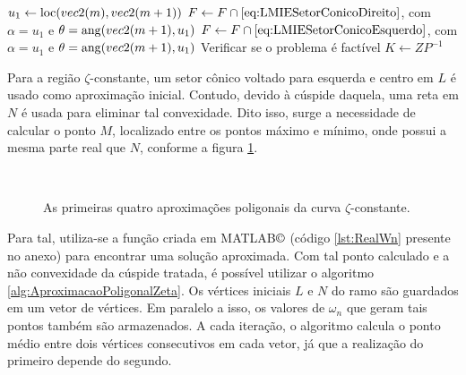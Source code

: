 \begin{algorithm}[ht!]
\begin{algorithmic}[1]
          \State $u_1 \gets \operatorname{loc}(vec2(m),vec2(m+1))$
            \State $F\gets F \cap \eqref{eq:LMIESetorConicoDireito}$, com $\alpha = u_1$ e $\theta = \operatorname{ang}(vec2(m+1),u_1)$ 
          \Else
            \State $F\gets F \cap \eqref{eq:LMIESetorConicoEsquerdo}$, com $\alpha = u_1$ e $\theta = \operatorname{ang}(vec2(m+1),u_1)$ 
          \EndIf
        \EndFor
        \State Verificar se o problema é factível 
    \EndWhile
    \State $K \gets ZP^{-1}$
  \end{algorithmic}
\end{algorithm}

Para a região $\zeta$-constante, um setor cônico voltado para esquerda e centro em $L$ é usado como aproximação inicial\cite{WISNIEWSKI2019}. Contudo, devido à cúspide daquela, uma reta em $N$ é usada para eliminar tal convexidade. Dito isso, surge a necessidade de calcular o ponto $M$, localizado entre os pontos máximo e mínimo, onde possui a mesma parte real que $N$, conforme a figura \ref{subfig:AproximacaoPoligonalZeta1}.

\begin{figure}[!ht]
  \centering
  \begin{subfigure}[t]{0.4\columnwidth}
      
      \caption{}
      \label{subfig:AproximacaoPoligonalZeta1}
  \end{subfigure}
  \begin{subfigure}[t]{0.4\columnwidth}
      
      \caption{}
      \label{subfig:AproximacaoPoligonalZeta2}
  \end{subfigure}
  \\
  \begin{subfigure}[t]{0.4\columnwidth}
    
    \caption{}
    \label{subfig:AproximacaoPoligonalZeta3}
  \end{subfigure}
  \begin{subfigure}[t]{0.4\columnwidth}
    
    \caption{}
    \label{subfig:AproximacaoPoligonalZeta4}
  \end{subfigure}
  \caption{As primeiras quatro aproximações poligonais da curva $\zeta$-constante.}
  \label{fig:AproximacoesPoligonalZeta}
\end{figure}

Para tal, utiliza-se a função criada em MATLAB$\copyright$\cite{MATLAB} (código \ref{lst:RealWn} presente no anexo) para encontrar uma solução aproximada. Com tal ponto calculado e a não convexidade da cúspide tratada, é possível utilizar o algoritmo \ref{alg:AproximacaoPoligonalZeta}. Os vértices iniciais $L$ e $N$ do ramo são guardados em um vetor de vértices. Em paralelo a isso, os valores de $\omega_n$ que geram tais pontos também são armazenados. A cada iteração, o algoritmo calcula o ponto médio entre dois vértices consecutivos em cada vetor, já que a realização do primeiro depende do segundo.

